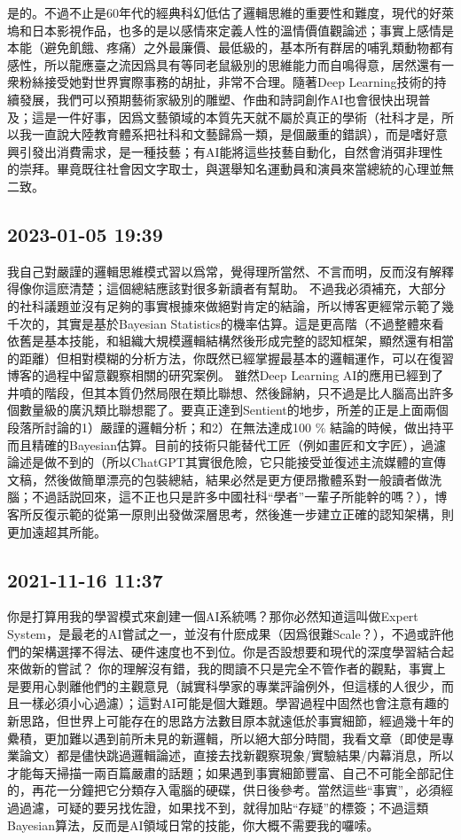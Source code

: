 \documentclass[twocolumn]{ctexart}
\begin{document}
是的。不過不止是60年代的經典科幻低估了邏輯思維的重要性和難度，現代的好萊塢和日本影視作品，也多的是以感情來定義人性的溫情價值觀論述；事實上感情是本能（避免飢餓、疼痛）之外最廉價、最低級的，基本所有群居的哺乳類動物都有感性，所以龍應臺之流因爲具有等同老鼠級別的思維能力而自鳴得意，居然還有一衆粉絲接受她對世界實際事務的胡扯，非常不合理。隨著Deep Learning技術的持續發展，我們可以預期藝術家級別的雕塑、作曲和詩詞創作AI也會很快出現普及；這是一件好事，因爲文藝領域的本質先天就不屬於真正的學術（社科才是，所以我一直說大陸教育體系把社科和文藝歸爲一類，是個嚴重的錯誤），而是嗜好意興引發出消費需求，是一種技藝；有AI能將這些技藝自動化，自然會消弭非理性的崇拜。畢竟既往社會因文字取士，與選舉知名運動員和演員來當總統的心理並無二致。
\subsection*{2023-01-05 19:39}

我自己對嚴謹的邏輯思維模式習以爲常，覺得理所當然、不言而明，反而沒有解釋得像你這麽清楚；這個總結應該對很多新讀者有幫助。
不過我必須補充，大部分的社科議題並沒有足夠的事實根據來做絕對肯定的結論，所以博客更經常示範了幾千次的，其實是基於Bayesian Statistics的機率估算。這是更高階（不過整體來看依舊是基本技能，和組織大規模邏輯結構然後形成完整的認知框架，顯然還有相當的距離）但相對模糊的分析方法，你既然已經掌握最基本的邏輯運作，可以在復習博客的過程中留意觀察相關的研究案例。
雖然Deep Learning AI的應用已經到了井噴的階段，但其本質仍然局限在類比聯想、然後歸納，只不過是比人腦高出許多個數量級的廣汎類比聯想罷了。要真正達到Sentient的地步，所差的正是上面兩個段落所討論的1）嚴謹的邏輯分析；和2）在無法達成100 \% 結論的時候，做出持平而且精確的Bayesian估算。目前的技術只能替代工匠（例如畫匠和文字匠），過濾論述是做不到的（所以ChatGPT其實很危險，它只能接受並復述主流媒體的宣傳文稿，然後做簡單漂亮的包裝總結，結果必然是更方便昂撒體系對一般讀者做洗腦；不過話説回來，這不正也只是許多中國社科“學者”一輩子所能幹的嗎？），博客所反復示範的從第一原則出發做深層思考，然後進一步建立正確的認知架構，則更加遠超其所能。
\subsection*{2021-11-16 11:37}

你是打算用我的學習模式來創建一個AI系統嗎？那你必然知道這叫做Expert System，是最老的AI嘗試之一，並沒有什麽成果（因爲很難Scale？），不過或許他們的架構選擇不得法、硬件速度也不到位。你是否設想要和現代的深度學習結合起來做新的嘗試？
你的理解沒有錯，我的閲讀不只是完全不管作者的觀點，事實上是要用心剝離他們的主觀意見（誠實科學家的專業評論例外，但這樣的人很少，而且一樣必須小心過濾）；這對AI可能是個大難題。學習過程中固然也會注意有趣的新思路，但世界上可能存在的思路方法數目原本就遠低於事實細節，經過幾十年的纍積，更加難以遇到前所未見的新邏輯，所以絕大部分時間，我看文章（即使是專業論文）都是儘快跳過邏輯論述，直接去找新觀察現象/實驗結果/内幕消息，所以才能每天掃描一兩百篇嚴肅的話題；如果遇到事實細節豐富、自己不可能全部記住的，再花一分鐘把它分類存入電腦的硬碟，供日後參考。當然這些“事實”，必須經過過濾，可疑的要另找佐證，如果找不到，就得加貼“存疑”的標簽；不過這類Bayesian算法，反而是AI領域日常的技能，你大概不需要我的囉嗦。
\end{document}
